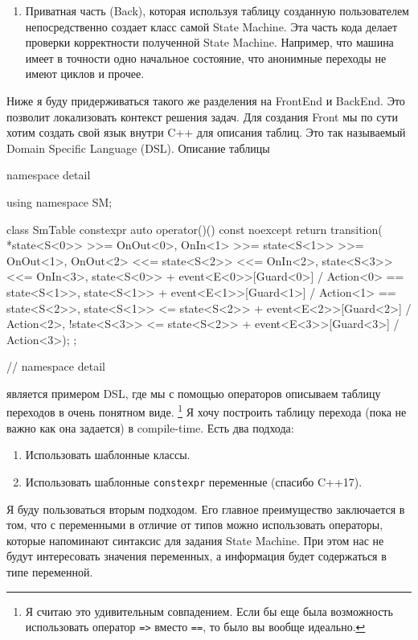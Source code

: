 \documentclass{article}
\begin{document}
{\begin{enumerate}
\item Приватная часть (Back), которая используя таблицу созданную пользователем непосредственно создает класс самой State Machine.
Эта часть кода делает проверки корректности полученной State Machine.
Например, что машина имеет в точности одно начальное состояние, что анонимные переходы не имеют циклов и прочее.
\end{enumerate}
Ниже я буду придерживаться такого же разделения на FrontEnd и BackEnd.
Это позволит локализовать контекст решения задач.
Для создания Front мы по сути хотим создать свой язык внутри C++ для описания таблиц.
Это так называемый Domain Specific Language (DSL).
Описание таблицы

\begin{cppcode}
namespace detail {
using namespace SM;

class SmTable {
  constexpr auto operator()() const noexcept {
    return transition(
        *state<S<0>> >>= OnOut<0>,
        OnIn<1> >>= state<S<1>> >>= OnOut<1>,
        OnOut<2> <<= state<S<2>> <<= OnIn<2>,
        state<S<3>> <<= OnIn<3>,
        state<S<0>> + event<E<0>>[Guard<0>] / Action<0> == state<S<1>>,
        state<S<1>> + event<E<1>>[Guard<1>] / Action<1> == state<S<2>>,
        state<S<1>> <= state<S<2>> + event<E<2>>[Guard<2>] / Action<2>,
        !state<S<3>> <= state<S<2>> + event<E<3>>[Guard<3>] / Action<3>);
  }
};
} // namespace detail
\end{cppcode}
является примером DSL, где мы с помощью операторов описываем таблицу переходов в очень понятном виде.%
\footnote{Я считаю это удивительным совпадением.
Если бы еще была возможность использовать оператор \texttt{=>} вместо \texttt{==}, то было вы вообще идеально.}
Я хочу построить таблицу перехода (пока не важно как она задается) в compile-time.
Есть два подхода:
\begin{enumerate}
\item Использовать шаблонные классы.

\item Использовать шаблонные \verb"constexpr" переменные (спасибо C++17).
\end{enumerate}
Я буду пользоваться вторым подходом.
Его главное преимущество заключается в том, что с переменными в отличие от типов можно использовать операторы, которые напоминают синтаксис для задания State Machine.
При этом нас не будут интересовать значения переменных, а информация будет содержаться в типе переменной.

}
\end{document}
